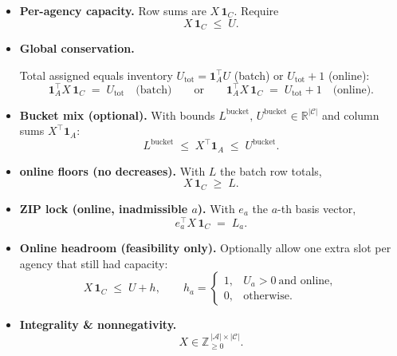 \documentclass[11pt]{article}
\newcommand{\A}{\mathcal{A}}                 %
\newcommand{\C}{\mathcal{C}}                 %
\begin{document}
\begin{itemize}[leftmargin=*]

\item \textbf{Per-agency capacity.} Row sums are $X\,\mathbf{1}_C$. Require
\begin{equation*}
X\,\mathbf{1}_C \;\le\; U.
\end{equation*}

\item \textbf{Global conservation.} 

Total assigned equals inventory 
$U_{\mathrm{tot}}=\mathbf{1}_A^\top U$ (batch) or $U_{\mathrm{tot}}+1$ (online):
\begin{equation*}
\mathbf{1}_A^\top X\,\mathbf{1}_C \;=\; U_{\mathrm{tot}}
\quad\text{(batch)}
\qquad\text{or}\qquad
\mathbf{1}_A^\top X\,\mathbf{1}_C \;=\; U_{\mathrm{tot}} + 1
\quad\text{(online)}.
\end{equation*}

\item \textbf{Bucket mix (optional).} With bounds 
$L^{\text{bucket}},\,U^{\text{bucket}} \in \mathbb{R}^{|\C|}$ and column sums $X^\top \mathbf{1}_A$:
\begin{equation*}
L^{\text{bucket}} \;\le\; X^\top \mathbf{1}_A \;\le\; U^{\text{bucket}}.
\end{equation*}

\item \textbf{online floors (no decreases).} With $L$ the batch row totals,
\begin{equation*}
X\,\mathbf{1}_C \;\ge\; L.
\end{equation*}

\item \textbf{ZIP lock (online, inadmissible $a$).} With $e_a$ the $a$-th basis vector,
\begin{equation*}
e_a^\top X\,\mathbf{1}_C \;=\; L_a.
\end{equation*}

\item \textbf{Online headroom (feasibility only).} Optionally allow one extra slot
per agency that still had capacity:
\begin{equation*}
X\,\mathbf{1}_C \;\le\; U + h,
\qquad
h_a=\begin{cases}
1, & U_a>0 \ \text{and online},\\
0, & \text{otherwise}.
\end{cases}
\end{equation*}

\item \textbf{Integrality \& nonnegativity.}
\begin{equation*}
X \in \mathbb{Z}_{\ge 0}^{\,|\A|\times |\C|}.
\end{equation*}

\end{itemize}
\end{document}
